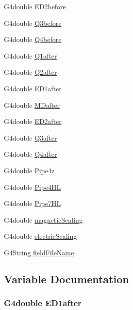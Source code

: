 \begin{DoxyCompactItemize}
G4double \hyperlink{EMFieldDebugger_8hh_a1fb2ee29034baaf6ed6e2acbdbf8b578}{E\+D2before}
\item 
G4double \hyperlink{EMFieldDebugger_8hh_a2fe0c19691575193f51b8ef4c4301aad}{Q3before}
\item 
G4double \hyperlink{EMFieldDebugger_8hh_a807b9ab7f57ec0c8bdc7764053d3e516}{Q4before}
\item 
G4double \hyperlink{EMFieldDebugger_8hh_a79e8de762c55f46eaf341c33ddcdfabd}{Q1after}
\item 
G4double \hyperlink{EMFieldDebugger_8hh_a9d33b4b693d4f7341602ab26cb44359c}{Q2after}
\item 
G4double \hyperlink{EMFieldDebugger_8hh_a56c3dd0f81ddd6f90cfcc044fb51dff1}{E\+D1after}
\item 
G4double \hyperlink{EMFieldDebugger_8hh_af04f7784a3cdd89375e6c74b915d255c}{M\+Dafter}
\item 
G4double \hyperlink{EMFieldDebugger_8hh_ad4c429af59f2e7eee31d1480df299599}{E\+D2after}
\item 
G4double \hyperlink{EMFieldDebugger_8hh_a7a55e4b1397f5859cde14aa271bb3717}{Q3after}
\item 
G4double \hyperlink{EMFieldDebugger_8hh_a47d7897cbc13a67cc420cfb3ec97fd60}{Q4after}
\item 
G4double \hyperlink{EMFieldDebugger_8hh_a58acf77da23d6d58252d729d4d8212d1}{Pipe4z}
\item 
G4double \hyperlink{EMFieldDebugger_8hh_ab20b3e8fa2797e410fb9110cfad39796}{Pipe4\+HL}
\item 
G4double \hyperlink{EMFieldDebugger_8hh_a7369eeb2c228d92eeb2a6e7ad496e13f}{Pipe7\+HL}
\item 
G4double \hyperlink{EMFieldDebugger_8hh_aeb29decdede3d925164d390a2bf4a67a}{magnetic\+Scaling}
\item 
G4double \hyperlink{EMFieldDebugger_8hh_a528ee0b2618db44ed7b0734789834f3d}{electric\+Scaling}
\item 
G4\+String \hyperlink{EMFieldDebugger_8hh_ae9b14cfeccc31b1bf76af2f4c3aae43d}{field\+File\+Name}
\end{DoxyCompactItemize}


\subsection{Variable Documentation}
\subsubsection[{\texorpdfstring{E\+D1after}{ED1after}}]{\setlength{\rightskip}{0pt plus 5cm}G4double E\+D1after}\hypertarget{EMFieldDebugger_8hh_a56c3dd0f81ddd6f90cfcc044fb51dff1}{}\label{EMFieldDebugger_8hh_a56c3dd0f81ddd6f90cfcc044fb51dff1}

